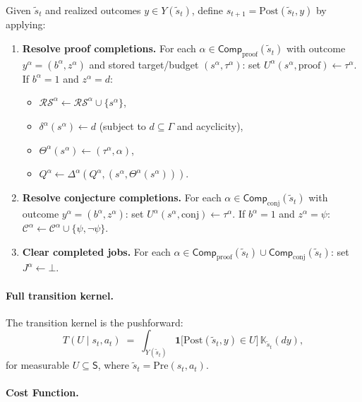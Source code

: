 Given $\tilde s_t$ and realized outcomes $y\in Y(\tilde s_t)$, define $s_{t+1} = \mathrm{Post}(\tilde s_t,y)$ by applying:
\begin{enumerate}
    \item \textbf{Resolve proof completions.} For each $\alpha\in\mathsf{Comp}_{\mathrm{proof}}(\tilde s_t)$ with outcome $y^\alpha = (b^\alpha, z^\alpha)$ and stored target/budget $(s^\alpha,\tau^\alpha)$: set $U^\alpha(s^\alpha,\mathrm{proof}) \leftarrow \tau^\alpha$. If $b^\alpha=1$ and $z^\alpha=d$:
\begin{itemize}
    \item $\mathcal{RS}^\alpha \leftarrow \mathcal{RS}^\alpha \cup \{s^\alpha\}$,
    \item $\delta^\alpha(s^\alpha) \leftarrow d$ \;(subject to $d\subseteq \Gamma$ and acyclicity),
    \item $\Theta^\alpha(s^\alpha)\leftarrow (\tau^\alpha,\alpha)$,
    \item $Q^\alpha \leftarrow \Delta^\alpha(Q^\alpha,(s^\alpha,\Theta^\alpha(s^\alpha)))$.
\end{itemize}
 
\item \textbf{Resolve conjecture completions.} For each $\alpha\in\mathsf{Comp}_{\mathrm{conj}}(\tilde s_t)$ with outcome $y^\alpha = (b^\alpha, z^\alpha)$: set $U^\alpha(s^\alpha,\mathrm{conj}) \leftarrow \tau^\alpha$. If $b^\alpha=1$ and $z^\alpha=\psi$:
$\mathcal C^\alpha \leftarrow \mathcal C^\alpha \cup \{\psi,\neg\psi\}$.
 
\item \textbf{Clear completed jobs.} For each $\alpha\in \mathsf{Comp}_{\mathrm{proof}}(\tilde s_t)\cup \mathsf{Comp}_{\mathrm{conj}}(\tilde s_t)$: set $J^\alpha \leftarrow \bot$.
\end{enumerate}
 
 
\paragraph{Full transition kernel.}
 
The transition kernel is the pushforward:
\[
T(U\mid s_t,a_t)
\;=\;
\int_{Y(\tilde s_t)}
\mathbf 1\!\big[\mathrm{Post}(\tilde s_t,y)\in U\big]\,
\mathbb K_{\tilde s_t}(dy),
\]
for measurable $U\subseteq \mathsf{S}$, where $\tilde s_t=\mathrm{Pre}(s_t,a_t)$.
 
 
\paragraph{Cost Function.}
 
